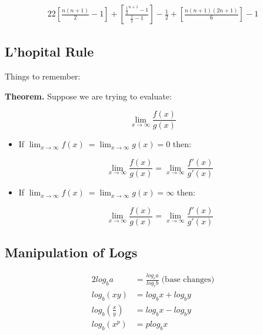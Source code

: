 \documentclass{article}
\begin{document}
\begin{alignat*}{2}
  2\left[\frac{n(n+1)}{2} - 1\right] + \left[\frac{\frac{1}{2}^{n+1} - 1}{\frac{1}{2} -1}\right] - \frac{1}{2} + \left[\frac{n(n+1)(2n+1)}{6}\right] - 1
\end{alignat*}

\subsection{L'hopital Rule}
Things to remember:

\textbf{Theorem.} Suppose we are trying to evaluate:

\begin{center}
  \[\lim_{x\to\infty}\frac{f(x)}{g(x)}\]
\end{center}
\begin{itemize}
  \item If $\lim_{x\to\infty} f(x)\ = \lim_{x\to\infty} g(x) = 0 $ then:
  \begin{center}
    \[\lim_{x\to\infty}\frac{f(x)}{g(x)} = \lim_{x\to\infty}\frac{f'(x)}{g'(x)} \]

  \end{center}
  \item If $\lim_{x\to\infty} f(x)\ = \lim_{x\to\infty} g(x) = \infty $ then:
  \begin{center}
    \[\lim_{x\to\infty}\frac{f(x)}{g(x)} = \lim_{x\to\infty}\frac{f'(x)}{g'(x)} \]
    
  \end{center}
\end{itemize}
\subsection{Manipulation of Logs}
\begin{alignat*}{2}
  log_b a &= \frac{log_c a}{log_c b} \;\text{(base changes)}\\
  log_b (xy) &= log_b x + log_b y\\
  log_b (\frac{x}{y}) &= log_b{x} - log_b{y}\\
  log_b (x^p) &= p log_b x \\
\end{alignat*}
\end{document}
